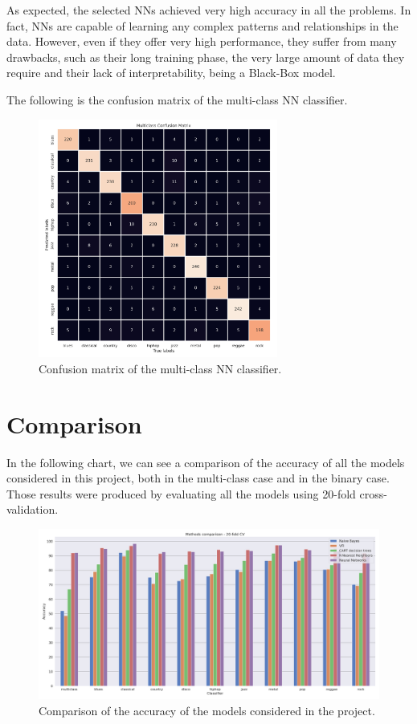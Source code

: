 \documentclass{Configuration_Files/PoliMi3i_thesis}
\begin{document}
As expected, the selected NNs achieved very high accuracy in all the problems.
In fact, NNs are capable of learning any complex patterns and relationships in the data. 
However, even if they offer very high performance, they suffer from many drawbacks, such as their long training phase, the very large amount of data they require and their lack of interpretability, being a Black-Box model.

The following is the confusion matrix of the multi-class NN classifier.

\begin{figure}[H]
    \centering
    \includegraphics[width=0.7\textwidth]{Figures/nn_m.png}
    \caption{Confusion matrix of the multi-class NN classifier.}
    \label{fig:nnm}
\end{figure}

\chapter{Comparison}
\label{ch:comparison}%
In the following chart, we can see a comparison of the accuracy of all the models considered in this project, both in the multi-class case and in the binary case.
Those results were produced by evaluating all the models using 20-fold cross-validation.

\begin{figure}[H]
    \centering
    \includegraphics[width=\textwidth]{Figures/comparison.png}
    \caption{Comparison of the accuracy of the models considered in the project.}
    \label{fig:comp}
\end{figure}
\end{document}
